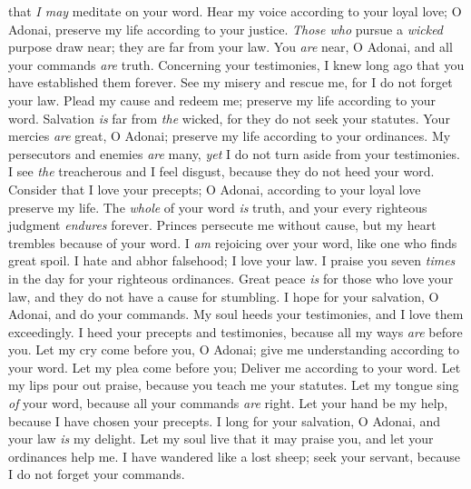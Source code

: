 \begin{biblechapter}
that \textit{I may} meditate on your word.
\verse Hear my voice according to your loyal love; 
O Adonai, preserve my life according to your justice.
\verse \textit{Those who} pursue a \textit{wicked} purpose draw near; 
they are far from your law.
\verse You \textit{are} near, O Adonai, 
and all your commands \textit{are} truth.
\verse Concerning your testimonies, I knew long ago 
that you have established them forever.
 See my misery and rescue me, 
for I do not forget your law.
\verse Plead my cause and redeem me; 
preserve my life according to your word.
\verse Salvation \textit{is} far from \textit{the} wicked, 
for they do not seek your statutes.
\verse Your mercies \textit{are} great, O Adonai; 
preserve my life according to your ordinances.
\verse My persecutors and enemies \textit{are} many, 
\textit{yet} I do not turn aside from your testimonies.
\verse I see \textit{the} treacherous and I feel disgust, 
because they do not heed your word.
\verse Consider that I love your precepts; 
O Adonai, according to your loyal love preserve my life.
\verse The \textit{whole} of your word \textit{is} truth, 
and your every righteous judgment \textit{endures} forever.
 Princes persecute me without cause, 
but my heart trembles because of your word.
\verse I \textit{am} rejoicing over your word, 
like one who finds great spoil.
\verse I hate and abhor falsehood; 
I love your law.
\verse I praise you seven \textit{times} in the day 
for your righteous ordinances.
\verse Great peace \textit{is} for those who love your law, 
and they do not have a cause for stumbling.
\verse I hope for your salvation, O Adonai, 
and do your commands.
\verse My soul heeds your testimonies, 
and I love them exceedingly.
\verse I heed your precepts and testimonies, 
because all my ways \textit{are} before you.
 Let my cry come before you, O Adonai; 
give me understanding according to your word.
\verse Let my plea come before you; 
Deliver me according to your word.
\verse Let my lips pour out praise, 
because you teach me your statutes.
\verse Let my tongue sing \textit{of} your word, 
because all your commands \textit{are} right.
\verse Let your hand be my help, 
because I have chosen your precepts.
\verse I long for your salvation, O Adonai, 
and your law \textit{is} my delight.
\verse Let my soul live that it may praise you, 
and let your ordinances help me.
\verse I have wandered like a lost sheep; seek your servant, 
because I do not forget your commands.
\end{biblechapter}

